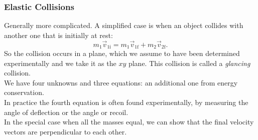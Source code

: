 \documentclass{beamer}
\begin{document}
\begin{frame}
\frametitle{Elastic Collisions}
Generally more complicated. A simplified case is when an object collides with another one that is initially at rest: $$m_1 \vec{v}_{1\mathrm{i}} = m_1 \vec{v}_{1\mathrm{f}} + m_2 \vec{v}_{2\mathrm{f}}.$$
So the collision occurs in a plane, which we assume to have been determined experimentally and we take it as the $xy$ plane. This collision is called a \textit{glancing} collision.
\\We have four unknowns and three equations: an additional one from energy conservation.
\\In practice the fourth equation is often found experimentally, by measuring the angle of deflection or the angle or recoil.
\\In the special case when all the masses equal, we can show that the final velocity vectors are perpendicular to each other.
\end{frame}
\end{document}
